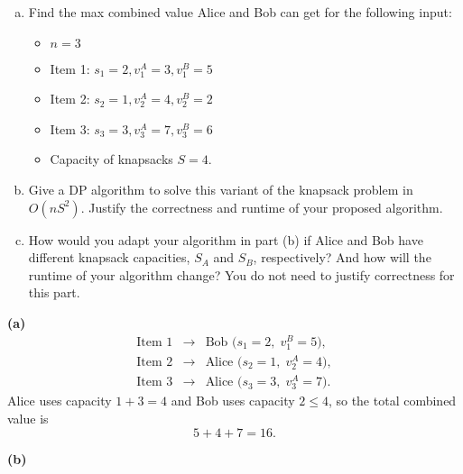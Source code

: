 \documentclass[11pt]{article}
\begin{document}
\begin{tcolorbox}[title={Problem 1 (Knapsack, Take II, 50 pts)}]
        \begin{enumerate}[(a)]
            \item Find the max combined value Alice and Bob can get for the following input:
            \begin{itemize}
                \item \( n = 3 \)
                \item Item 1: \( s_1 = 2, v_1^A = 3, v_1^B = 5 \)
                \item Item 2: \( s_2 = 1, v_2^A = 4, v_2^B = 2 \)
                \item Item 3: \( s_3 = 3, v_3^A = 7, v_3^B = 6 \)
                \item Capacity of knapsacks \(S = 4\).
            \end{itemize} 
            \item Give a DP algorithm to solve this variant of the knapsack problem in $O(nS^2)$. Justify the correctness and runtime of your proposed algorithm. 
            \item How would you adapt your algorithm in part (b) if Alice and Bob have different knapsack capacities, \(S_A\) and \(S_B\), respectively? And how will the runtime of your algorithm change? You do not need to justify correctness for this part.
        \end{enumerate}
    \end{tcolorbox}

    \textbf{(a)}
    \[
    \begin{array}{rcl}
    \text{Item 1} &\to& \text{Bob (} s_1=2,\; v_1^B=5\text{)},\\[1mm]
    \text{Item 2} &\to& \text{Alice (} s_2=1,\; v_2^A=4\text{)},\\[1mm]
    \text{Item 3} &\to& \text{Alice (} s_3=3,\; v_3^A=7\text{)}.
    \end{array}
    \]
    Alice uses capacity \(1+3=4\) and Bob uses capacity \(2\le 4\), so the total combined value is 
    \[
    5+4+7=\boxed{16}.
    \]
    
    \medskip
    
    \textbf{(b)}
    
\end{document}
